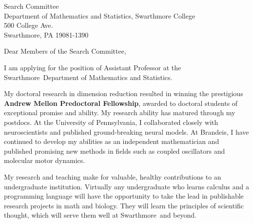 \documentclass[11pt,a4paper]{letter}
\begin{document}

\def\School{Swarthmore}

\begin{letter}
{Search Committee\\
Department of Mathematics and Statistics, Swarthmore College\\
500 College Ave.\\
Swarthmore, PA 19081-1390}


\opening{Dear Members of the Search Committee,}

I am applying for the position of Assistant Professor at the \School~Department of Mathematics and Statistics. 

My doctoral research in dimension reduction resulted in winning the prestigious \textbf{Andrew Mellon Predoctoral Fellowship}, awarded to doctoral students of exceptional promise and ability. My research ability has matured through my postdocs. At the University of Pennsylvania, I collaborated closely with neuroscientists and published ground-breaking neural models. At Brandeis, I have continued to develop my abilities as an independent mathematician and published promising new methods in fields such as coupled oscillators and molecular motor dynamics.

My research and teaching make for valuable, healthy contributions to an undergraduate institution. Virtually any undergraduate who learns calculus and a programming language will have the opportunity to take the lead in publishable research projects in math and biology. They will learn the principles of scientific thought, which will serve them well at \School~and beyond.




\end{letter}
\end{document}
